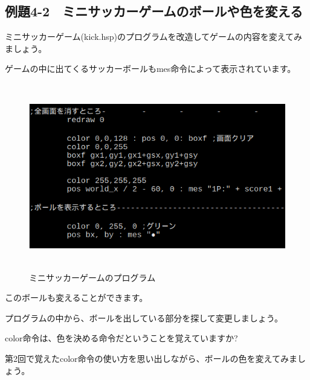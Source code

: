\newpage
\subsection{例題4-2　ミニサッカーゲームのボールや色を変える}

\begin{description}
    \item {}
\end{description}

ミニサッカーゲーム(kick.hsp)のプログラムを改造してゲームの内容を変えてみましょう。

ゲームの中に出てくるサッカーボールもmes命令によって表示されています。


\begin{figure}[H]
    \begin{center}
      \includegraphics[keepaspectratio,width=14.499cm,height=8.123cm]{text04-img/s_kicksrc2.png}
      \caption{ミニサッカーゲームのプログラム}
    \end{center}
    \label{fig:prog_menu}
\end{figure}


このボールも変えることができます。

プログラムの中から、ボールを出している部分を探して変更しましょう。



color命令は、色を決める命令だということを覚えていますか?

第2回で覚えたcolor命令の使い方を思い出しながら、ボールの色を変えてみましょう。


